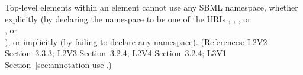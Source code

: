 Top-level elements within an  element cannot use any SBML
namespace, whether explicitly (by declaring the namespace to be one of the
URIs ,
, 
, or\\
, or\\
), or implicitly (by failing
to declare any namespace).  (References: L2V2 Section~3.3.3; L2V3
Section~3.2.4; L2V4 Section~3.2.4; L3V1 Section~\ref{sec:annotation-use}.)

